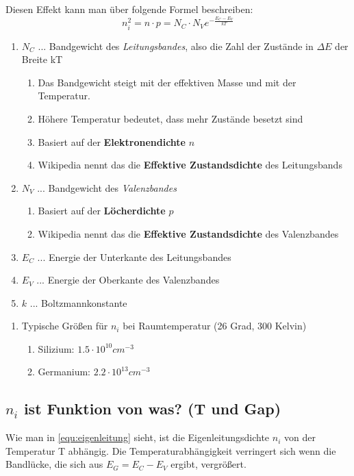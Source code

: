 	Diesen Effekt kann man über folgende Formel beschreiben:
	\begin{equation}
	    n_i^2 = n \cdot p = N_C \cdot N_V e^{-\frac{E_C-E_V}{kT}}
	\end{equation}\label{equ:eigenleitung}
	
	\begin{enumerate}
	    \item $N_C$ ... Bandgewicht des \emph{Leitungsbandes}, also die Zahl der Zustände in $\Delta E$ der Breite kT
	    \begin{enumerate}
	        \item Das Bandgewicht steigt mit der effektiven Masse und mit der Temperatur.
	        \item Höhere Temperatur bedeutet, dass mehr Zustände besetzt sind
	        \item Basiert auf der \textbf{Elektronendichte} $n$
	        \item Wikipedia nennt das die \textbf{Effektive Zustandsdichte} des Leitungsbands
	    \end{enumerate}
	    \item $N_V$ ... Bandgewicht des \emph{Valenzbandes}
	    \begin{enumerate}
	        \item Basiert auf der \textbf{Löcherdichte} $p$
	        \item Wikipedia nennt das die \textbf{Effektive Zustandsdichte} des Valenzbandes
	    \end{enumerate}
	    \item $E_C$ ... Energie der Unterkante des Leitungsbandes
	    \item $E_V$ ... Energie der Oberkante des Valenzbandes
	    \item $k$ ... Boltzmannkonstante
	\end{enumerate}
	
	\begin{enumerate}
	    \item Typische Größen für $n_i$ bei Raumtemperatur (26 Grad, 300 Kelvin)
	    \begin{enumerate}
	        \item Silizium: $1.5 \cdot 10^{10} cm^{-3}$
	        \item Germanium: $2.2 \cdot 10^{13} cm^{-3}$
	    \end{enumerate}
	\end{enumerate}
	
	\subsection{$n_i$ ist Funktion von was? (T und Gap)}
    Wie man in \autoref{equ:eigenleitung} sieht, ist die Eigenleitungsdichte $n_i$ von der Temperatur T abhängig.
    Die Temperaturabhängigkeit verringert sich wenn die Bandlücke, die sich aus $E_G = E_C - E_V$ ergibt, vergrößert. 
    
